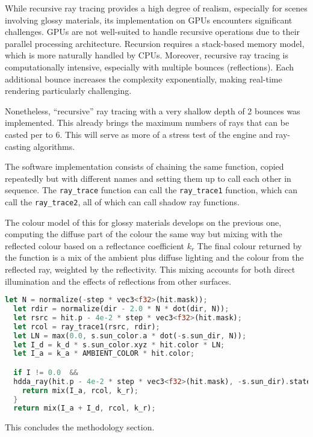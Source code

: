While recursive ray tracing provides a high degree of realism, especially for scenes involving glossy materials, its implementation on GPUs encounters significant challenges. GPUs are not well-suited to handle recursive operations due to their parallel processing architecture. Recursion requires a stack-based memory model, which is more naturally handled by CPUs. Moreover, recursive ray tracing is computationally intensive, especially with multiple bounces (reflections). Each additional bounce increases the complexity exponentially, making real-time rendering particularly challenging.

Nonetheless, ``recursive'' ray tracing with a very shallow depth of 2 bounces was implemented. This already brings the maximum numbers of rays that can be casted per to 6.
This will serve as more of a stress test of the engine and ray-casting algorithms.

The software implementation consists of chaining the same function, copied repeatedly but with different names and setting them up to call each other in sequence.
The \texttt{ray\_trace} function can call the \texttt{ray\_trace1} function, which can call the \texttt{ray\_trace2}, all of which can call shadow ray functions.

The colour model of this for glossy materials develops on the previous one, computing the diffuse part of the colour the same way but mixing with the reflected colour based on a reflectance coefficient $k_{r}$
The final colour returned by the function is a mix of the ambient plus diffuse lighting and the colour from the reflected ray, weighted by the reflectivity.
This mixing accounts for both direct illumination and the effects of reflections from other surfaces.

\begin{lstlisting}[language=rust,caption={Glossy materials color model}, captionpos=b]
  let N = normalize(-step * vec3<f32>(hit.mask));
  let rdir = normalize(dir - 2.0 * N * dot(dir, N));
  let rsrc = hit.p - 4e-2 * step * vec3<f32>(hit.mask);
  let rcol = ray_trace1(rsrc, rdir);
  let LN = max(0.0, s.sun_color.a * dot(-s.sun_dir, N));
  let I_d = k_d * s.sun_color.xyz * hit.color * LN;
  let I_a = k_a * AMBIENT_COLOR * hit.color;

  if I != 0.0  &&
  hdda_ray(hit.p - 4e-2 * step * vec3<f32>(hit.mask), -s.sun_dir).state == 0u {
    return mix(I_a, rcol, k_r);
  }
  return mix(I_a + I_d, rcol, k_r);
\end{lstlisting}

This concludes the methodology section.
